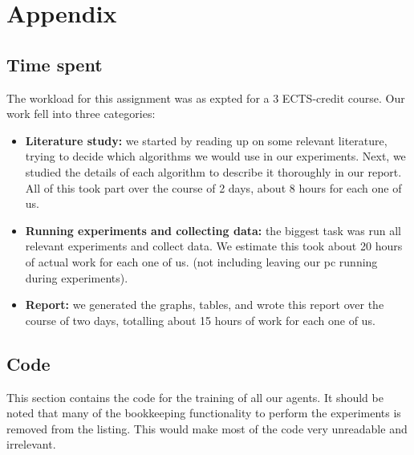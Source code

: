 \documentclass[10pt,a4paper]{article}
\begin{document}







\newpage
\section*{Appendix}
\subsection{Time spent}
The workload for this assignment was as expted for a 3 ECTS-credit course. Our work fell into three categories:
\begin{itemize}
\item{\textbf{Literature study: } we started by reading up on some relevant literature, trying to decide which algorithms we would use in our experiments. Next, we studied the details of each algorithm to describe it thoroughly in our report. All of this took part over the course of 2 days, about 8 hours for each one of us.}
\item{\textbf{Running experiments and collecting data: } the biggest task was run all relevant experiments and collect data. We estimate this took about 20 hours of actual work for each one of us. (not including leaving our pc running during experiments).}
\item{\textbf{Report: } we generated the graphs, tables, and wrote this report over the course of two days, totalling about 15 hours of work for each one of us.}
\end{itemize}
\subsection{Code}
This section contains the code for the training of all our agents.
It should be noted that many of the bookkeeping functionality to perform the experiments is removed from the listing. This would make most of the code very unreadable and irrelevant.
\end{document}
